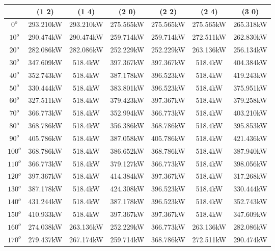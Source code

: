         \begin{table}[H]
        	\centering
        	\begin{tabular}{|c|c|c|c|c|c|c|} \hline
        			& (1 2)		& (1 4)		& (2 0)		& (2 2)		& (2 4)		& (3 0)		\\ \hline
		$0^o$	& 293.210kW	& 293.210kW	& 275.565kW	& 275.565kW	& 275.565kW	& 265.318kW	\\ \hline
		$10^o$	& 290.474kW	& 290.474kW	& 259.714kW	& 259.714kW	& 272.511kW	& 262.830kW	\\ \hline
		$20^o$	& 282.086kW	& 282.086kW	& 252.229kW	& 252.229kW	& 263.136kW	& 256.134kW	\\ \hline
		$30^o$	& 347.609kW	& 518.4kW	& 397.367kW	& 397.367kW	& 518.4kW	& 404.384kW	\\ \hline
		$40^o$	& 352.743kW	& 518.4kW	& 387.178kW	& 396.523kW	& 518.4kW	& 419.243kW	\\ \hline
		$50^o$	& 330.444kW	& 518.4kW	& 383.801kW	& 396.523kW	& 518.4kW	& 375.951kW	\\ \hline
		$60^o$	& 327.511kW	& 518.4kW	& 379.423kW	& 397.367kW	& 518.4kW	& 379.258kW	\\ \hline
		$70^o$	& 366.773kW	& 518.4kW	& 352.994kW	& 366.773kW	& 518.4kW	& 403.210kW	\\ \hline
		$80^o$	& 368.786kW	& 518.4kW	& 356.386kW	& 368.786kW	& 518.4kW	& 395.853kW	\\ \hline
		$90^o$	& 405.786kW	& 518.4kW	& 387.058kW	& 405.786kW	& 518.4kW	& 421.436kW	\\ \hline
		$100^o$	& 368.786kW	& 518.4kW	& 386.652kW	& 368.786kW	& 518.4kW	& 387.940kW	\\ \hline
		$110^o$	& 366.773kW	& 518.4kW	& 379.127kW	& 366.773kW	& 518.4kW	& 398.056kW	\\ \hline
		$120^o$	& 397.367kW	& 518.4kW	& 414.384kW	& 397.367kW	& 518.4kW	& 317.268kW	\\ \hline
		$130^o$	& 387.178kW	& 518.4kW	& 424.308kW	& 396.523kW	& 518.4kW	& 330.444kW	\\ \hline
		$140^o$	& 431.244kW	& 518.4kW	& 387.178kW	& 396.523kW	& 518.4kW	& 352.743kW	\\ \hline
		$150^o$	& 410.933kW	& 518.4kW	& 397.367kW	& 397.367kW	& 518.4kW	& 347.609kW	\\ \hline
		$160^o$	& 274.038kW	& 263.136kW	& 252.229kW	& 366.773kW	& 263.136kW	& 282.086kW	\\ \hline
		$170^o$	& 279.437kW	& 267.174kW	& 259.714kW	& 368.786kW	& 272.511kW	& 290.474kW	\\ \hline

\end{tabular}
\end{table}
